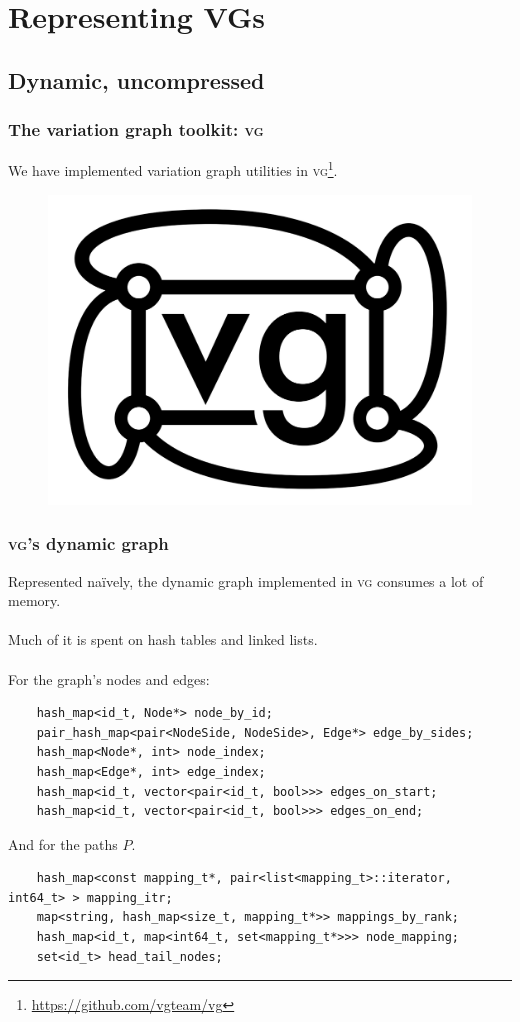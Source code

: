 \documentclass{beamer}
\begin{document}
\section{Representing VGs}

\subsection{Dynamic, uncompressed}

\begin{frame}
  \frametitle{The variation graph toolkit: \textsc{vg}}
    We have implemented variation graph utilities in \textsc{vg}\footnote{\url{https://github.com/vgteam/vg}}.
  \begin{figure}
    \includegraphics[scale=0.2,center]{vg_logo.png}
  \end{figure}
\end{frame}
  
\begin{frame}[fragile]
  \frametitle{\textsc{vg}'s dynamic graph}
  Represented naïvely, the dynamic graph implemented in \textsc{vg} consumes a lot of memory.
  \\~\\
  Much of it is spent on hash tables and linked lists.
  \\~\\
  For the graph's nodes and edges:
  \begin{lstlisting}
    hash_map<id_t, Node*> node_by_id;
    pair_hash_map<pair<NodeSide, NodeSide>, Edge*> edge_by_sides;
    hash_map<Node*, int> node_index;
    hash_map<Edge*, int> edge_index;
    hash_map<id_t, vector<pair<id_t, bool>>> edges_on_start;
    hash_map<id_t, vector<pair<id_t, bool>>> edges_on_end;
  \end{lstlisting}

  And for the paths $P$.
  
  \begin{lstlisting}
    hash_map<const mapping_t*, pair<list<mapping_t>::iterator, int64_t> > mapping_itr;
    map<string, hash_map<size_t, mapping_t*>> mappings_by_rank;
    hash_map<id_t, map<int64_t, set<mapping_t*>>> node_mapping;
    set<id_t> head_tail_nodes;
  \end{lstlisting}
\end{frame}
\end{document}
